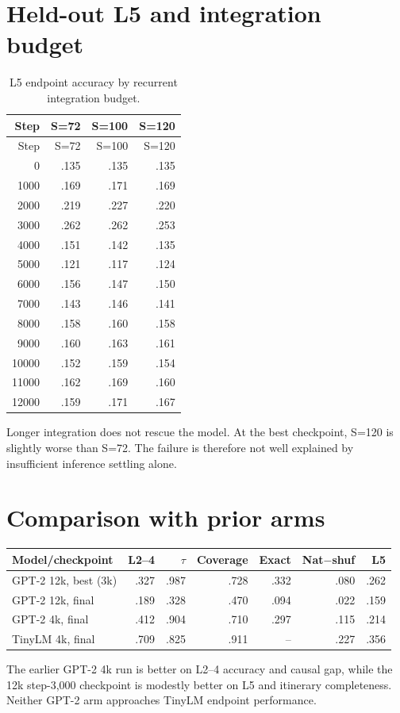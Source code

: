 \documentclass[10pt]{article}
\begin{document}
\section{Held-out L5 and integration budget}
\begin{longtable}{rrrr}
\caption{L5 endpoint accuracy by recurrent integration budget.}\\
\toprule Step&S=72&S=100&S=120\\\midrule\endfirsthead
\toprule Step&S=72&S=100&S=120\\\midrule\endhead
0&.135&.135&.135\\1000&.169&.171&.169\\2000&.219&.227&.220\\
3000&.262&.262&.253\\4000&.151&.142&.135\\5000&.121&.117&.124\\
6000&.156&.147&.150\\7000&.143&.146&.141\\8000&.158&.160&.158\\
9000&.160&.163&.161\\10000&.152&.159&.154\\11000&.162&.169&.160\\
12000&.159&.171&.167\\\bottomrule
\end{longtable}
Longer integration does not rescue the model. At the best checkpoint, S=120 is
slightly worse than S=72. The failure is therefore not well explained by
insufficient inference settling alone.

\section{Comparison with prior arms}
\begin{tabular}{lrrrrrr}
\toprule Model/checkpoint&L2--4&$\tau$&Coverage&Exact&Nat$-$shuf&L5\\\midrule
GPT-2 12k, best (3k)&.327&.987&.728&.332&.080&.262\\
GPT-2 12k, final&.189&.328&.470&.094&.022&.159\\
GPT-2 4k, final&.412&.904&.710&.297&.115&.214\\
TinyLM 4k, final&.709&.825&.911&--&.227&.356\\
\bottomrule
\end{tabular}

The earlier GPT-2 4k run is better on L2--4 accuracy and causal gap, while the
12k step-3,000 checkpoint is modestly better on L5 and itinerary completeness.
Neither GPT-2 arm approaches TinyLM endpoint performance.
\end{document}
